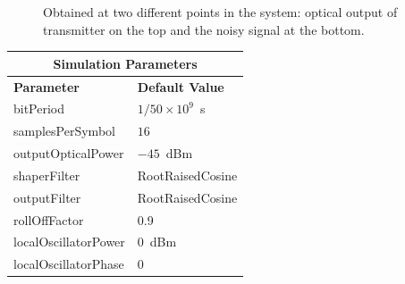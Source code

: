 \begin{refsection}
\begin{figure}[H]
\begin{minipage}{\linewidth}
	\caption{
		Obtained
		at two different points in the system: optical output of transmitter on the top and
		the noisy signal at the bottom.
		\label{fig:eyes_n_rc_45_09}}
	\end{minipage}
\end{figure}
\begin{table}[H]
	\centering
	\footnotesize
	\begin{tabular}{|l|l|}
		\hline
		\multicolumn{2}{|c|}{ \textbf{Simulation Parameters} } \\
		\hline
		\textbf{Parameter}     & \textbf{Default Value}                                     \\\hline
		bitPeriod              & $1/50\times10^9$~s														\\\hline
		samplesPerSymbol       & $16$                                                       \\\hline
		outputOpticalPower     & $-45$~dBm 													\\ \hline
		shaperFilter	       & RootRaisedCosine												\\ \hline
		outputFilter		   & RootRaisedCosine												\\ \hline
		rollOffFactor		   & 0.9														\\ \hline
		localOscillatorPower   & $0$~dBm                                                    \\ \hline
		localOscillatorPhase   & $0$                                                        \\ \hline

\end{tabular}
\end{table}
\end{refsection}
